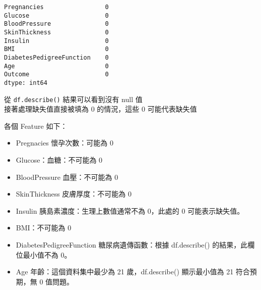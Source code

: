 \documentclass[11pt]{article}
\makeatletter
\providecommand{\tightlist}{%
      \setlength{\itemsep}{0pt}\setlength{\parskip}{0pt}}
\newcommand{\boxspacing}{\kern\kvtcb@left@rule\kern\kvtcb@boxsep}
\newcommand{\prompt}[4]{
        {\ttfamily\llap{{\color{#2}[#3]:\hspace{3pt}#4}}\vspace{-\baselineskip}}
    }
\makeatother
\begin{document}
            \begin{tcolorbox}[breakable, size=fbox, boxrule=.5pt, pad at break*=1mm, opacityfill=0]
\prompt{Out}{outcolor}{7}{\boxspacing}
\begin{Verbatim}[commandchars=\\\{\}]
Pregnancies                 0
Glucose                     0
BloodPressure               0
SkinThickness               0
Insulin                     0
BMI                         0
DiabetesPedigreeFunction    0
Age                         0
Outcome                     0
dtype: int64
\end{Verbatim}
\end{tcolorbox}
        
    從 \texttt{df.describe()} 結果可以看到沒有 null 值\\
接著處理缺失值直接被填為 0 的情況，這些 0 可能代表缺失值

    各個 Feature 如下：

\begin{itemize}
\tightlist
\item
  Pregnacies 懷孕次數：可能為 0
\item
  Glucose：血糖：不可能為 0
\item
  BloodPressure 血壓：不可能為 0
\item
  SkinThickness 皮膚厚度：不可能為 0
\item
  Insulin 胰島素濃度：生理上數值通常不為 0，此處的 0 可能表示缺失值。
\item
  BMI：不可能為 0
\item
  DiabetesPedigreeFunction 糖尿病遺傳函數：根據 df.describe()
  的結果，此欄位最小值不為 0。
\item
  Age 年齡：這個資料集中最少為 21 歲，df.describe() 顯示最小值為 21
  符合預期，無 0 值問題。
\end{itemize}
\end{document}
